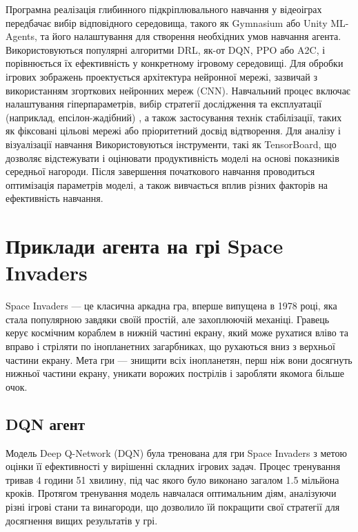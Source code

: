  Програмна реалізація глибинного підкріплювального навчання у відеоіг\-рах передбачає вибір
  відповідного середовища, такого як Gymnasium або Unity ML-Agents, та його налаштування 
  для створення необхідних умов навчання агента. Використовуються популярні алгоритми DRL,
  як-от DQN, PPO або A2C, і порівнюється їх ефективність у конкретному ігровому середовищі.
   Для обробки ігрових зображень проектується архітектура нейронної мережі, зазвичай з 
   використанням згорткових нейронних мереж (CNN). Навчальний процес включає налаштування
    гіперпараметрів, вибір стратегії дослідження та експлуатації (наприклад, епсілон-жадібний)
    , а також застосування технік стабілізації, таких як фіксовані цільові мережі або 
    пріоритетний досвід відтворення. Для аналізу і візуалізації навчання Використовуються
     інструменти, такі як TensorBoard, що дозволяє відстежувати і оцінювати продуктивність
    моделі на основі показників середньої нагороди. Після завершення початкового навчання
    проводиться оптимізація параметрів моделі, а також вивчається вплив різних факторів 
    на ефективність навчання.
\section{Приклади агента на грі Space Invaders}
Space Invaders — це класична аркадна гра, вперше випущена в 1978 році, яка стала 
популярною завдяки своїй простій, але захоплюючій механіці. Гравець керує космічним 
кораблем в нижній частині екрану, який може рухатися вліво та вправо і стріляти по інопланетних 
 загарбниках, що рухаються вниз з верхньої частини екрану. Мета гри — знищити всіх 
 інопланетян, перш ніж вони досягнуть нижньої частини екрану, уникати ворожих пострілів
  і заробляти якомога більше очок.

  \setcounter{equation}{0}
 \setcounter{theorem}{0}
 \subsection{DQN агент}
 Модель Deep Q-Network (DQN) була тренована для гри Space Invaders з метою оцінки її ефективності 
 у вирішенні складних ігрових задач. Процес тренування тривав 4 години 51 хвилину, під час якого 
 було виконано загалом 1.5 мільйона кроків. Протягом тренування модель навчалася оптимальним діям, 
 аналізуючи різні ігрові стани та винагороди, що дозволило їй покращити свої стратегії для досягнення 
 вищих результатів у грі.

